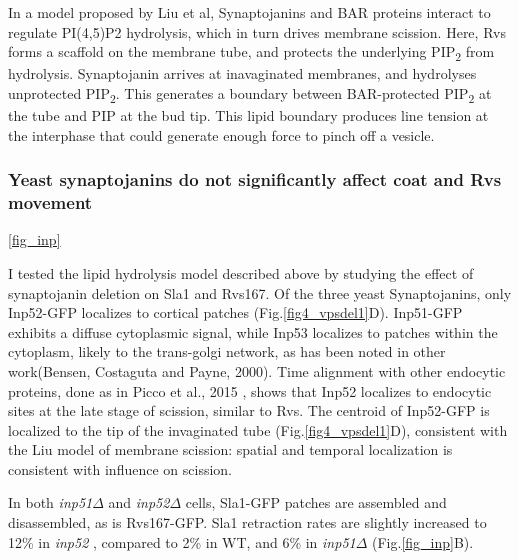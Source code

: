 \vspace{5mm}
In a model proposed by Liu et al, Synaptojanins and BAR proteins interact to regulate PI(4,5)P2 hydrolysis, which in turn drives membrane scission. Here, Rvs forms a scaffold on the membrane tube, and protects the underlying	PIP\textsubscript{2}  from hydrolysis. Synaptojanin arrives at inavaginated membranes, and hydrolyses unprotected	PIP\textsubscript{2}. This generates a boundary between BAR-protected 	PIP\textsubscript{2} at the tube and PIP at the bud tip. This lipid boundary produces line tension at the interphase that could generate enough force to pinch off a vesicle. 


	\subsubsection{Yeast synaptojanins do not significantly affect coat and Rvs movement } 
\ref{fig_inp}
	

I tested the lipid hydrolysis model described above by studying the effect of synaptojanin deletion on Sla1 and Rvs167. 
Of the three yeast Synaptojanins, only Inp52-GFP localizes to cortical patches (Fig.\ref{fig4_vpsdel1}D). Inp51-GFP exhibits a diffuse cytoplasmic signal, while Inp53 localizes to patches within the cytoplasm, likely to the trans-golgi network, as has been noted in other work(Bensen, Costaguta and Payne, 2000). Time alignment with other endocytic proteins, done as in Picco et al., 2015 , shows that Inp52 localizes to endocytic sites at the late stage of scission, similar to Rvs. The centroid of Inp52-GFP is localized to the tip of the invaginated tube (Fig.\ref{fig4_vpsdel1}D), consistent with the Liu model of membrane scission: spatial and temporal localization is consistent with influence on scission. 

	\vspace{5mm}
	
In both \textit{inp51$\Delta$} and \textit{inp52$\Delta$} cells, Sla1-GFP patches are assembled and disassembled, as is Rvs167-GFP. Sla1 retraction rates are slightly increased to 12\% in \textit{inp52\textDelta}  , compared to 2\% in WT, and 6\% in \textit{inp51$\Delta$}
 (Fig.\ref{fig_inp}B). 
\vspace{5mm}
		
